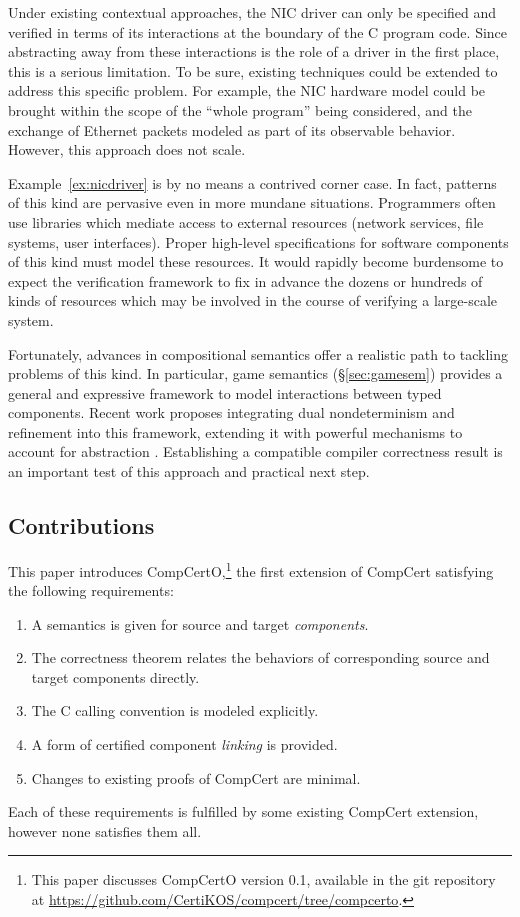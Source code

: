 \documentclass[sigplan,screen]{acmart}
\begin{document}
Under existing contextual approaches,
the NIC driver can only be specified and verified in terms of
its interactions at the boundary of the C program code.
Since abstracting away from these interactions
is the role of a driver in the first place,
this is a serious limitation.
%
To be sure,
existing techniques could be extended
to address this specific problem.
For example,
the NIC hardware model could be brought
within the scope of the ``whole program'' being considered,
and the exchange of Ethernet packets
modeled as part of its observable behavior.
However, this approach does not scale.

Example~\ref{ex:nicdriver}
is by no means a contrived corner case.
In fact, patterns of this kind are pervasive even in more mundane situations.
Programmers often use libraries
which mediate access to external resources
(network services, file systems, user interfaces).
Proper high-level specifications
for software components of this kind
must model these resources.
It would rapidly become burdensome to expect
the verification framework
to fix in advance
the dozens or hundreds
of kinds of resources
which may be involved
in the course of verifying a large-scale system.

Fortunately,
advances in compositional semantics
offer a realistic path
to tackling problems of this kind.
In particular,
game semantics (\S\ref{sec:gamesem})
provides a general and expressive framework
to model interactions between typed components.
Recent work proposes integrating
dual nondeterminism and refinement
into this framework,
extending it with powerful mechanisms
to account for abstraction \cite{rbgs-cal}.
Establishing a compatible compiler correctness result
is an important test of this approach
and practical next step.


\subsection{Contributions} \label{sec:compcertreq} %

This paper introduces CompCertO,\footnote{%
  This paper discusses CompCertO version 0.1,
  available in the git repository at
  \url{https://github.com/CertiKOS/compcert/tree/compcerto}.
  }
the first extension of CompCert
satisfying the following requirements:
\begin{enumerate}
\item \label{req:opensem}
  A semantics is given for
  source and target \emph{components}.
\item \label{req:opensim}
  The correctness theorem relates
  the behaviors of corresponding
  source and target components directly.
\item \label{req:openabs}
  The C calling convention is modeled explicitly.
\item \label{req:linking}
  A form of certified component \emph{linking}
  is provided.
\item \label{req:complexity}
  Changes to existing proofs of CompCert
  are minimal.
\end{enumerate}
Each of these requirements is fulfilled
by some existing CompCert extension,
however none satisfies them all.
\end{document}

